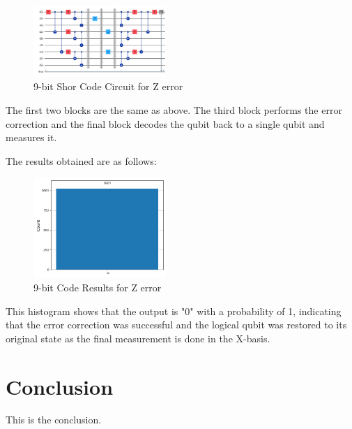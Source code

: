 \documentclass[conference]{IEEEtran}
\begin{document}
\begin{figure}[h]
    \centering
    \includegraphics[width=0.45\textwidth]{../Codes/results/9bitCode/FinalCircuit.png}
    \caption{9-bit Shor Code Circuit for Z error}
    \label{fig:9bitCodeCircuit}
\end{figure}

The first two blocks are the same as above. The third block performs the error correction and the final block decodes the qubit back to a single qubit and measures it.

The results obtained are as follows:
\begin{figure}[h]
    \centering
    \includegraphics[width=0.45\textwidth]{../Codes/results/9bitCode/FinalHistogram.png}
    \caption{9-bit Code Results for Z error}
    \label{fig:9bitCodeResults}
\end{figure}

This histogram shows that the output is "0" with a probability of 1, indicating that the error correction was successful and the logical qubit was restored to its original state as the final measurement is done in the X-basis.
\section{Conclusion}
This is the conclusion.



\end{document}
